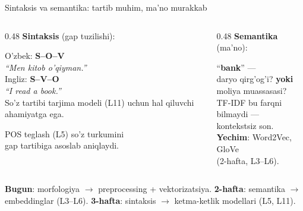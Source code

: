 \documentclass[aspectratio=169,11pt]{beamer}
\begin{document}
\begin{frame}{Sintaksis va semantika: tartib muhim, ma'no murakkab}
  \begin{columns}[T]
    \begin{column}{0.48\textwidth}
      \textbf{Sintaksis} (gap tuzilishi):\\[3pt]
      \begin{tcolorbox}[defbox,title={SOV (subject, object, verb) vs SVO},top=2pt,bottom=2pt]
        \footnotesize
        O'zbek: \textbf{S--O--V}\\
        \textit{``Men kitob o'qiyman.''}\\[3pt]
        Ingliz: \textbf{S--V--O}\\
        \textit{``I read a book.''}\\[3pt]
        So'z tartibi tarjima modeli (L11)
        uchun hal qiluvchi ahamiyatga ega.
      \end{tcolorbox}
      \vspace{3pt}
      \footnotesize
      POS teglash (L5) so'z turkumini\\
      gap tartibiga asoslab aniqlaydi.
    \end{column}
    \begin{column}{0.48\textwidth}
      \textbf{Semantika} (ma'no):\\[3pt]
      \begin{tcolorbox}[defbox,title=Ko'p ma'nolilik (polysemy),top=2pt,bottom=2pt]
        \footnotesize
        ``\textbf{bank}'' ---\\
        \quad daryo qirg'og'i? \textbf{yoki}\\
        \quad moliya muassasasi?\\[3pt]
        TF-IDF bu farqni \alert{bilmaydi} ---\\
        kontekstsiz son.\\[3pt]
        \textcolor{deepgreen}{\textbf{Yechim}}: Word2Vec, GloVe\\
        (2-hafta, L3--L6).
      \end{tcolorbox}
    \end{column}
  \end{columns}
  \vspace{4pt}
  \begin{tcolorbox}[okbox,title=Kurs manzarasi,top=2pt,bottom=2pt]
    \footnotesize
    \textbf{Bugun}: morfologiya $\to$ preprocessing + vektorizatsiya. \quad
    \textbf{2-hafta}: semantika $\to$ embeddinglar (L3--L6). \quad
    \textbf{3-hafta}: sintaksis $\to$ ketma-ketlik modellari (L5, L11).
  \end{tcolorbox}
\end{frame}
\end{document}
